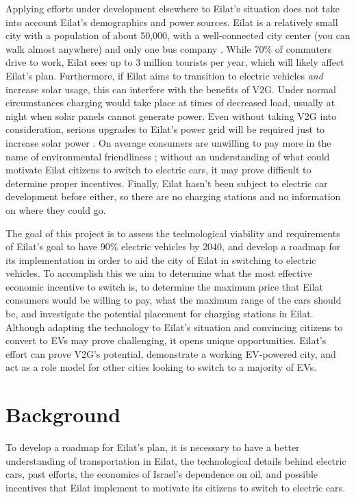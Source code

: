 \documentclass[12pt]{article}                         %
\begin{document}
Applying efforts under development elsewhere to Eilat's situation does not take into account Eilat's demographics and power sources. Eilat is a relatively small city with a population of about 50,000, with a well-connected city center (you can walk almost anywhere) and only one bus company \cite{TransportationEilat}. While 70\% of commuters drive to work, Eilat sees up to 3 million tourists per year, which will likely affect Eilat's plan. Furthermore, if Eilat aims to transition to electric vehicles \textit{and} increase solar usage, this can interfere with the benefits of V2G. Under normal circumstances charging would take place at times of decreased load, usually at night when solar panels cannot generate power. Even without taking V2G into consideration, serious upgrades to Eilat's power grid will be required just to increase solar power \cite{Vardimon2011AssessmentIsrael}. On average consumers are unwilling to pay more in the name of environmental friendliness \cite{Mock2010MarketVehicles}; without an understanding of what could motivate Eilat citizens to switch to electric cars, it may prove difficult to determine proper incentives. Finally, Eilat hasn't been subject to electric car development before either, so there are no charging stations and no information on where they could go.

The goal of this project is to assess the technological viability and requirements of Eilat's goal to have 90\% electric vehicles by 2040, and develop a roadmap for its implementation in order to aid the city of Eilat in switching to electric vehicles. To accomplish this we aim to determine what the most effective economic incentive to switch is, to determine the maximum price that Eilat consumers would be willing to pay, what the maximum range of the cars should be, and investigate the potential placement for charging stations in Eilat. Although adapting the technology to Eilat's situation and convincing citizens to convert to EVs may prove challenging, it opens unique opportunities. Eilat's effort can prove V2G's potential, demonstrate a working EV-powered city, and act as a role model for other cities looking to switch to a majority of EVs.

\newpage
\section{Background}
To develop a roadmap for Eilat's plan, it is necessary to have a better understanding of transportation in Eilat, the technological details behind electric cars, past efforts, the economics of Israel's dependence on oil, and possible incentives that Eilat implement to motivate its citizens to switch to electric cars.
\end{document}
